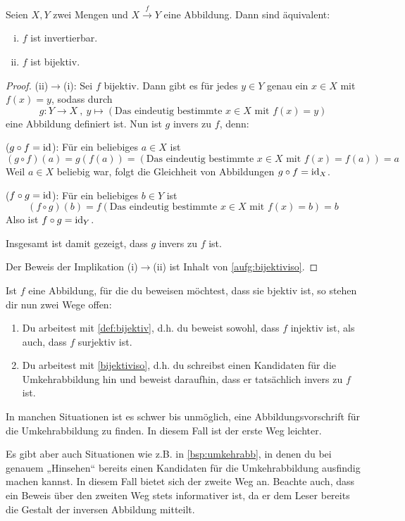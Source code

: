 \begin{satz} \label{bijektiviso}
    Seien $X,Y$ zwei Mengen und $X\xrightarrow{f} Y$ eine Abbildung. Dann sind äquivalent:
    \begin{enumerate}[(i)]
        \item $f$ ist invertierbar.
        \item $f$ ist bijektiv.
    \end{enumerate}
\end{satz}
\begin{proof}
    (ii)$\to$(i): Sei $f$ bijektiv. Dann gibt es für jedes $y\in Y$ genau ein $x\in X$ mit $f(x)=y$, sodass durch
        \[ g : Y\to X \ ,\ y \mapsto (\text{Das eindeutig bestimmte $x\in X$ mit $f(x)=y$}) \]
    eine Abbildung definiert ist. Nun ist $g$ invers zu $f$, denn:
    \begin{labeling}
        \item[($g\circ f=\mathrm{id}$):] Für ein beliebiges $a\in X$ ist
            \[ (g\circ f)(a) = g(f(a)) = (\text{Das eindeutig bestimmte $x\in X$ mit $f(x)=f(a)$}) = a \]
        Weil $a\in X$ beliebig war, folgt die Gleichheit von Abbildungen $g\circ f=\mathrm{id}_X$.
        \item[($f\circ g=\mathrm{id}$):] Für ein beliebiges $b\in Y$ ist
            \[ (f\circ g)(b) = f(\text{Das eindeutig bestimmte $x\in X$ mit $f(x)=b$}) = b \]
        Also ist $f\circ g=\mathrm{id}_Y$.
    \end{labeling}
    Insgesamt ist damit gezeigt, dass $g$ invers zu $f$ ist.

    Der Beweis der Implikation (i)$\to$(ii) ist Inhalt von \cref{aufg:bijektiviso}.
\end{proof}


\begin{bem}
    Ist $f$ eine Abbildung, für die du beweisen möchtest, dass sie bjektiv ist, so stehen dir nun zwei Wege offen:
    \begin{enumerate}
        \item Du arbeitest mit \cref{def:bijektiv}, d.h. du beweist sowohl, dass $f$ injektiv ist, als auch, dass $f$ surjektiv ist.
        \item Du arbeitest mit \cref{bijektiviso}, d.h. du schreibst einen Kandidaten für die Umkehrabbildung hin und beweist daraufhin, dass er tatsächlich invers zu $f$ ist.
    \end{enumerate}
    In manchen Situationen ist es schwer bis unmöglich, eine Abbildungsvorschrift für die Umkehrabbildung zu finden. In diesem Fall ist der erste Weg leichter.
    
    Es gibt aber auch Situationen wie z.B. in \cref{bsp:umkehrabb}, in denen du bei genauem „Hinsehen“ bereits einen Kandidaten für die Umkehrabbildung ausfindig machen kannst. In diesem Fall bietet sich der zweite Weg an. Beachte auch, dass ein Beweis über den zweiten Weg stets informativer ist, da er dem Leser bereits die Gestalt der inversen Abbildung mitteilt.
\end{bem}


